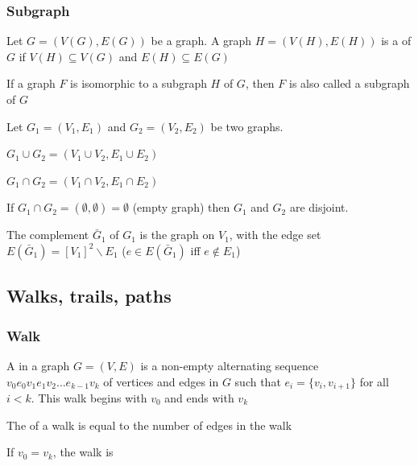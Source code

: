 \documentclass[aspectratio=43]{beamer}
\begin{document}
\begin{frame}\frametitle{Subgraph}
\begin{definition}[Subgraph]
Let $G=(V(G),E(G))$ be a graph.
A graph $H=(V(H),E(H))$ is a  of $G$ if $V(H)\subseteq V(G)$ and $E(H)\subseteq E(G)$
\end{definition}
\vfill
\begin{definition}
If a graph $F$ is isomorphic to a subgraph $H$ of $G$, then $F$ is also called a subgraph of $G$
\end{definition}
\end{frame}


\begin{frame}
Let $G_1=(V_1,E_1)$ and $G_2=(V_2,E_2)$ be two graphs.
\begin{definition}
$G_1\cup G_2=(V_1\cup V_2,E_1\cup E_2)$
\end{definition}
\begin{definition}
$G_1\cap G_2=(V_1\cap V_2,E_1\cap E_2)$
\end{definition}
\begin{definition}
If $G_1\cap G_2=(\emptyset,\emptyset)= \emptyset$ (empty graph) then $G_1$ and $G_2$ are disjoint.
\end{definition}
\begin{definition}[{Complement of $G_1$}]
The complement $\bar G_1$ of $G_1$ is the graph on $V_1$, with the edge set $E(\bar G_1)=[V_1]^2\backslash E_1$ ($e\in E(\bar G_1)$ iff $e\not \in E_1$)
\end{definition}
\end{frame}


\subsection{Walks, trails, paths}


\begin{frame}\frametitle{Walk}
\begin{definition}[{Walk}]
A  in a graph $G=(V,E)$ is a non-empty alternating sequence $v_0 e_0 v_1 e_1 v_2 \dots e_{k-1} v_k$ of vertices and edges in $G$ such that $e_i=\{v_i, v_{i+1}\}$ for all $i<k$. 
This walk begins with $v_0$ and ends with $v_k$
\end{definition}
\vfill
\begin{definition}
The  of a walk is equal to the number of edges in the walk
\end{definition}
\vfill
\begin{definition}
If $v_0=v_k$, the walk is 
\end{definition}
\end{frame}
\end{document}
